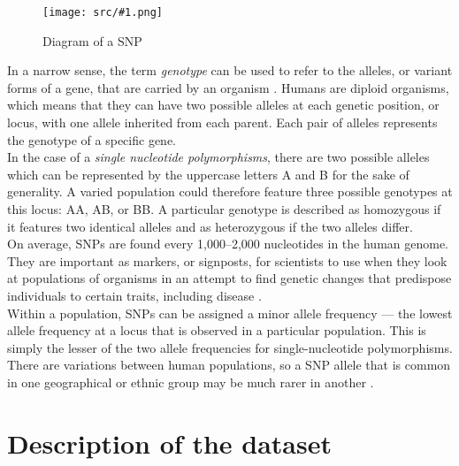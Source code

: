 \documentclass[a4paper, 11pt]{article}
\newcommand{\Figure}[3]{
	\begin{figure}[!h]
	\centering
	\texttt{[image: src/\#1.png]}
	\caption{#3}
	\label{fig:#1}
	\end{figure}
}
\theoremstyle{definition}
\theoremstyle{remark}
\begin{document}
\Figure{snp_diagram}{7}{Diagram of a SNP \cite{GeneticsWiki}}


In a narrow sense, the term \textit{genotype} can be used to refer to the alleles, or variant forms of a gene, that are carried by an organism \cite{NatureGenotype}. Humans are diploid organisms, which means that they can have two possible alleles at each genetic position, or locus, with one allele inherited from each parent. Each pair of alleles represents the genotype of a specific gene.\\

In the case of a \textit{single nucleotide polymorphisms}, there are two possible alleles which can be represented by the uppercase letters A and B for the sake of generality. A varied population could therefore feature three possible genotypes at this locus: AA, AB, or BB. A particular genotype is described as homozygous if it features two identical alleles and as heterozygous if the two alleles differ.\\


On average, SNPs are found every 1,000–2,000 nucleotides in the human genome. They are important as markers, or signposts, for scientists to use when they look at populations of organisms in an attempt to find genetic changes that predispose individuals to certain traits, including disease \cite{NatureGeneticMutation}.\\

Within a population, SNPs can be assigned a minor allele frequency — the lowest allele frequency at a locus that is observed in a particular population. This is simply the lesser of the two allele frequencies for single-nucleotide polymorphisms. There are variations between human populations, so a SNP allele that is common in one geographical or ethnic group may be much rarer in another \cite{GeneticsWiki}.\ \newpage


\section{Description of the dataset}
\end{document}
